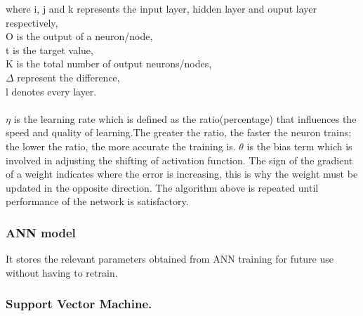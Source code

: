 where i, j and k represents the input layer, hidden layer and ouput layer respectively,\\
O is the output of a neuron/node,\\
t is the target value,\\
K is the total number of output neurons/nodes,\\
$\Delta$ represent the difference,\\
l denotes every layer.\\
\\
$\eta$ is the learning rate which is defined as the ratio(percentage) that influences the speed and quality of learning.The greater the ratio, the faster the neuron trains;
the lower the ratio, the more accurate the training is. $\theta$ is the bias term which is involved in adjusting the shifting of activation function. The sign of the gradient
of a weight indicates where the error is increasing, this is why the weight must be updated in the opposite direction. The algorithm above is
repeated until performance of the network is satisfactory.

\subsubsection{ANN model}
It stores the relevant parameters obtained from ANN training for future use without having to retrain.

\subsubsection{Support Vector Machine.}

